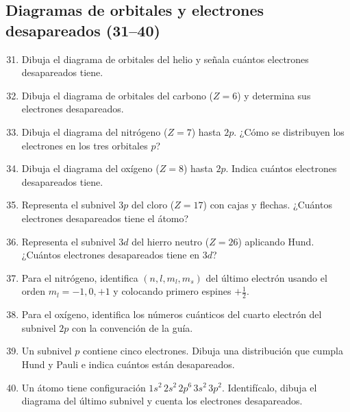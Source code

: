 \documentclass[12pt, letterpaper]{article}
\begin{document}
\subsection{Diagramas de orbitales y electrones desapareados (31--40)}
\begin{enumerate}[leftmargin=*, label=\textbf{\arabic*.}]
  \setcounter{enumi}{30}
  \item \facil{} Dibuja el diagrama de orbitales del helio y señala cuántos electrones desapareados tiene.
  \item \medio{} Dibuja el diagrama de orbitales del carbono ($Z=6$) y determina sus electrones desapareados.
  \item \medio{} Dibuja el diagrama del nitrógeno ($Z=7$) hasta $2p$. ¿Cómo se distribuyen los electrones en los tres orbitales $p$?
  \item \medio{} Dibuja el diagrama del oxígeno ($Z=8$) hasta $2p$. Indica cuántos electrones desapareados tiene.
  \item \medio{} Representa el subnivel $3p$ del cloro ($Z=17$) con cajas y flechas. ¿Cuántos electrones desapareados tiene el átomo?
  \item \dificil{} Representa el subnivel $3d$ del hierro neutro ($Z=26$) aplicando Hund. ¿Cuántos electrones desapareados tiene en $3d$?
  \item \medio{} Para el nitrógeno, identifica $(n,l,m_l,m_s)$ del último electrón usando el orden $m_l=-1,0,+1$ y colocando primero espines $+\tfrac12$.
  \item \dificil{} Para el oxígeno, identifica los números cuánticos del cuarto electrón del subnivel $2p$ con la convención de la guía.
  \item \medio{} Un subnivel $p$ contiene cinco electrones. Dibuja una distribución que cumpla Hund y Pauli e indica cuántos están desapareados.
  \item \dificil{} Un átomo tiene configuración $1s^2\,2s^2\,2p^6\,3s^2\,3p^2$. Identifícalo, dibuja el diagrama del último subnivel y cuenta los electrones desapareados.
\end{enumerate}
\end{document}
